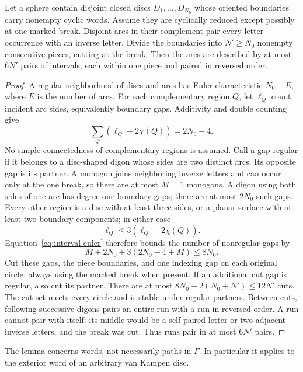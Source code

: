 \begin{lemma}\label{lem:interval}
Let a sphere contain disjoint closed discs $D_1,\dots,D_{N_0}$ whose oriented boundaries carry nonempty cyclic words. Assume they are cyclically reduced except possibly at one marked break. Disjoint arcs in their complement pair every letter occurrence with an inverse letter. Divide the boundaries into $N'\ge N_0$ nonempty consecutive pieces, cutting at the break. Then the arcs are described by at most $6N'$ pairs of intervals, each within one piece and paired in reversed order.
\end{lemma}
\begin{proof}
A regular neighborhood of discs and arcs has Euler characteristic $N_0-E$, where $E$ is the number of arcs. For each complementary region $Q$, let $\ell_Q$ count incident arc sides, equivalently boundary gaps. Additivity and double counting give
\begin{equation}\label{eq:interval-euler}
 \sum_Q(\ell_Q-2\chi(Q))=2N_0-4.
\end{equation}
No simple connectedness of complementary regions is assumed. Call a gap regular if it belongs to a disc-shaped digon whose sides are two distinct arcs. Its opposite gap is its partner. A monogon joins neighboring inverse letters and can occur only at the one break, so there are at most $M=1$ monogons. A digon using both sides of one arc has degree-one boundary gaps; there are at most $2N_0$ such gaps. Every other region is a disc with at least three sides, or a planar surface with at least two boundary components; in either case
\[
 \ell_Q\le3(\ell_Q-2\chi(Q)).
\]
Equation~\eqref{eq:interval-euler} therefore bounds the number of nonregular gaps by
\[
 M+2N_0+3(2N_0-4+M)\le8N_0.
\]
Cut these gaps, the piece boundaries, and one indexing gap on each original circle, always using the marked break when present. If an additional cut gap is regular, also cut its partner. There are at most $8N_0+2(N_0+N')\le12N'$ cuts. The cut set meets every circle and is stable under regular partners. Between cuts, following successive digons pairs an entire run with a run in reversed order. A run cannot pair with itself: its middle would be a self-paired letter or two adjacent inverse letters, and the break was cut. Thus runs pair in at most $6N'$ pairs.
\end{proof}

The lemma concerns words, not necessarily paths in $\Gamma$. In particular it applies to the exterior word of an arbitrary van Kampen disc.

